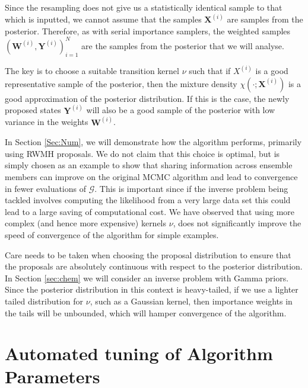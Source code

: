 \documentclass[final]{siamltex}
\newcommand{\G}{\mathcal{G}}
\newcommand{\X}{{\mathbf X}}
\newcommand{\Y}{{\mathbf Y}}
\newcommand{\W}{{\mathbf W}}
\begin{document}
Since the resampling does not give us a statistically identical sample
to that which is inputted, we cannot assume that the samples $\X^{(i)}$
are samples from the posterior. Therefore, as with serial
importance samplers, the weighted samples
$(\W^{(i)},\Y^{(i)})_{i=1}^N$ are the samples from the posterior that
we will analyse.

The key is to choose a suitable transition kernel $\nu$ such that
if $X^{(i)}$ is a good representative sample of the posterior,
then the mixture density $\chi(\cdot;\X^{(i)})$ is a good
approximation of the posterior distribution. If this is the case,
the newly proposed states $\Y^{(i)}$ will also be a good sample of the posterior with low variance in the
weights $\W^{(i)}$.

In Section \ref{Sec:Num}, we will demonstrate how the algorithm
performs, primarily using RWMH proposals. We do not claim that this choice is optimal, but
is simply chosen as an example to show that sharing information across
ensemble members can improve on the original MCMC algorithm and lead to
convergence in fewer evaluations of $\G$. This is important since if
the inverse problem being tackled involves computing
the likelihood from a very large data set this could lead to a
large saving of computational cost. We have observed that
using more complex (and hence more expensive) kernels $\nu$, does not
significantly improve the speed of convergence of the algorithm for
simple examples\cite{Paul}.

Care needs to be taken when choosing the proposal distribution to
ensure that the proposals are absolutely continuous with respect to
the posterior distribution. In Section \ref{sec:chem} we will consider
an inverse problem with Gamma priors. Since the posterior distribution
in this context is heavy-tailed, if we use a lighter tailed
distribution for $\nu$, such as a Gaussian kernel, then importance
weights in the tails will be unbounded, which will hamper convergence
of the algorithm.

\section{Automated tuning of Algorithm Parameters}\label{Sec:adapt}
\end{document}
